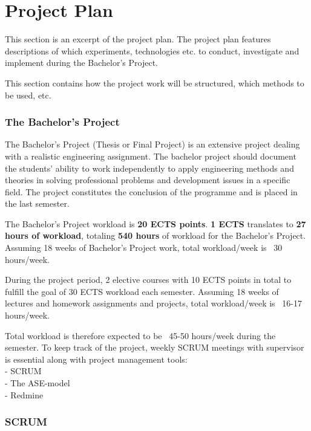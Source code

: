 \chapter{Project Plan}
This section is an excerpt of the project plan. The project plan features descriptions of which experiments, technologies etc. to conduct, investigate and implement during the Bachelor's Project. \newline

This section contains how the project work will be structured, which methods to be used, etc. \newline

\subsection{The Bachelor's Project}
The Bachelor’s Project (Thesis or Final Project) is an extensive project dealing with a realistic engineering assignment. The bachelor project should document the students’ ability to work independently to apply engineering methods and theories in solving professional problems and development issues in a specific field. The project constitutes the conclusion of the programme and is placed in the last semester. \newline

The Bachelor's Project workload is \textbf{20 ECTS points}. \textbf{1 ECTS} translates to \textbf{27 hours of workload}, totaling \textbf{540 hours} of workload for the Bachelor's Project. Assuming 18 weeks of Bachelor's Project work, total workload/week is ~30 hours/week. \newline

During the project period, 2 elective courses with 10 ECTS points in total to fulfill the goal of 30 ECTS workload each semester. Assuming 18 weeks of lectures and homework assignments and projects, total workload/week is ~16-17 hours/week. \newline

Total workload is therefore expected to be ~45-50 hours/week during the semester. To keep track of the project, weekly SCRUM meetings with supervisor is essential along with project management tools: \\

- SCRUM \\
- The ASE-model \\
- Redmine \newline

\subsection{SCRUM}


